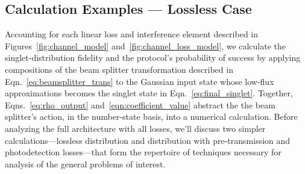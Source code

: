 \documentclass[aps,twocolumn,secnumarabic,amsmath,amssymb,pra,groupedaddress,
showpacs, showkeys,draft]{revtex4-1}
\begin{document}
\subsection{Calculation Examples --- Lossless Case\label{sec:example:first}}

Accounting for each linear loss and interference element described in
Figures~\ref{fig:channel_model} and~\ref{fig:channel_loss_model}, we calculate
the singlet-distribution fidelity and the protocol's probability of success by
applying compositions of the beam splitter transformation described in
Eqn.~\ref{eq:beamsplitter_trans} to the Gaussian input state whose low-flux
approximations becomes the singlet state in
Eqn.~\ref{eq:final_singlet}. Together, Eqns.~\ref{eq:rho_output}
and~\ref{eqn:coefficient_value} abstract the the beam splitter's action, in the
number-state basis, into a numerical calculation. Before analyzing the full
architecture with all losses, we'll discuss two simpler calculations---lossless
distribution and distribution with pre-transmission and photodetection
losses---that form the repertoire of techniques necessary for analysis of the
general problems of interest. 
\end{document}
